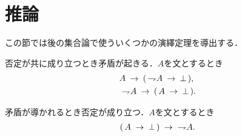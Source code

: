 \section{推論}
	この節では後の集合論で使ういくつかの演繹定理を導出する．
	
	\begin{screen}
		\begin{logicalaxm}[矛盾の導入]
		\label{logicalaxm:introduction_of_contradiction}
			否定が共に成り立つとき矛盾が起きる．$A$を文とするとき
			\begin{align}
				&A \hspace{0.25em}\rightarrow\hspace{0.25em} (\, \rightharpoondown\hspace{-0.25em} A \hspace{0.25em}\rightarrow\hspace{0.25em} \bot\, ), \\
				&\rightharpoondown\hspace{-0.25em} A \hspace{0.25em}\rightarrow\hspace{0.25em} (\, A \hspace{0.25em}\rightarrow\hspace{0.25em} \bot\, ).
			\end{align}
		\end{logicalaxm}
	\end{screen}
	
	\begin{screen}
		\begin{logicalaxm}[否定の導入]
		\label{logicalaxm:introduction_of_negation}
			矛盾が導かれるとき否定が成り立つ．$A$を文とするとき
			\begin{align}
				(\, A \hspace{0.25em}\rightarrow\hspace{0.25em} \bot\, ) \hspace{0.25em}\rightarrow\hspace{0.25em}\ \rightharpoondown\hspace{-0.25em} A.
			\end{align}
		\end{logicalaxm}
	\end{screen}
	
